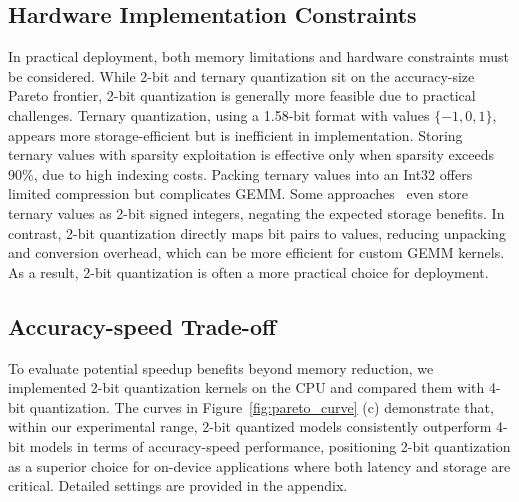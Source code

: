 \subsection{Hardware Implementation Constraints}
\label{sec:on_device}

In practical deployment, both memory limitations and hardware constraints must be considered. While 2-bit and ternary quantization sit on the accuracy-size Pareto frontier, 2-bit quantization is generally more feasible due to practical challenges. 
Ternary quantization, using a 1.58-bit format with values  \(\{-1, 0, 1\}\), appears more storage-efficient but is inefficient in implementation.
Storing ternary values with sparsity exploitation is effective only when sparsity exceeds 90\%, due to high indexing costs. Packing ternary values into an Int32 offers limited compression but complicates GEMM. Some approaches~\cite{yang20241} even store ternary values as 2-bit signed integers, negating the expected storage benefits. In contrast, 2-bit quantization directly maps bit pairs to values, reducing unpacking and conversion overhead, which can be more efficient for custom GEMM kernels. As a result, 2-bit quantization is often a more practical choice for deployment.

\subsection{Accuracy-speed Trade-off}
To evaluate potential speedup benefits beyond memory reduction, we implemented 2-bit quantization kernels on the CPU and compared them with 4-bit quantization. The curves in Figure~\ref{fig:pareto_curve} (c) demonstrate that, within our experimental range, 2-bit quantized models consistently outperform 4-bit models in terms of accuracy-speed performance, positioning 2-bit quantization as a superior choice for on-device applications where both latency and storage are critical. Detailed settings are provided in the appendix.